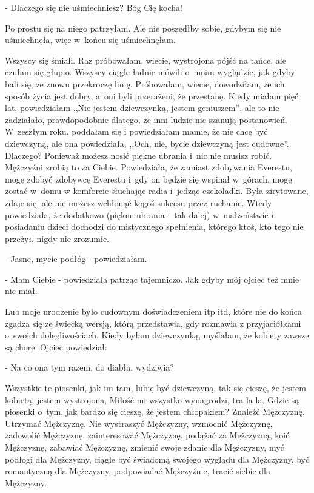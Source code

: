 \documentclass[oneside,polish,12pt,sfheadings]{mwbk}
\begin{document}
- Dlaczego się nie uśmiechniesz? Bóg Cię kocha!

 Po prostu się na niego patrzyłam. Ale
nie poszedłby sobie, gdybym się nie uśmiechnęła, więc w~końcu się
uśmiechnęłam.

Wszyscy się śmiali. Raz próbowałam, wiecie, wystrojona pójść na tańce,
ale czułam się głupio. Wszyscy ciągle ładnie mówili o~moim wyglądzie,
jak gdyby bali się, że znowu przekroczę linię. Próbowałam, wiecie,
dowodziłam, że ich sposób życia jest dobry, a~oni byli przerażeni,
że przestanę. Kiedy miałam pięć lat, powiedziałam ,,Nie jestem dziewczynką,
jestem geniuszem'', ale to nie zadziałało, prawdopodobnie dlatego,
że inni ludzie nie szanują postanowień. W~zeszłym roku, poddałam się
i powiedziałam mamie, że nie chcę być dziewczyną, ale ona powiedziała,
,,Och, nie, bycie dziewczyną jest cudowne''. Dlaczego? Ponieważ możesz
nosić piękne ubrania i~nic nie musisz robić. Mężczyźni zrobią to za
Ciebie. Powiedziała, że zamiast zdobywania Everestu, mogę zdobyć zdobywcę
Everestu i~gdy on będzie się wspinał w~górach, mogę zostać w~domu
w komforcie słuchając radia i~jedząc czekoladki. Była zirytowane,
zdaje się, ale nie możesz wchłonąć kogoś sukcesu przez ruchanie. Wtedy
powiedziała, że dodatkowo (piękne ubrania i~tak dalej) w~małżeństwie
i posiadaniu dzieci dochodzi do mistycznego spełnienia, którego ktoś,
kto tego nie przeżył, nigdy nie zrozumie. 

- Jasne, mycie podłóg -
powiedziałam.

- Mam Ciebie - powiedziała patrząc tajemniczo. Jak gdyby mój ojciec
też mnie nie miał.

Lub moje urodzenie było cudownym doświadczeniem itp itd, które nie
do końca zgadza się ze świecką wersją, którą przedstawia, gdy rozmawia
z przyjaciółkami o~swoich dolegliwościach. Kiedy byłam dziewczynką,
myślałam, że kobiety zawsze są chore. Ojciec powiedział: 

- Na co ona tym razem, do diabła, wydziwia? 

Wszystkie te piosenki, jak im tam,
lubię być dziewczyną, tak się cieszę, że jestem kobietą, jestem wystrojona,
Miłość mi wszystko wynagrodzi, tra la la. Gdzie są piosenki o~tym,
jak bardzo się cieszę, że jestem chłopakiem? Znaleźć Mężczyznę. Utrzymać
Mężczyznę. Nie wystraszyć Mężczyzny, wzmocnić Mężczyznę, zadowolić
Mężczyznę, zainteresować Mężczyznę, podążać za Mężczyzną, koić Mężczyznę,
zabawiać Mężczyznę, zmienić swoje zdanie dla Mężczyzny, myć podłogi
dla Mężczyzny, ciągle być świadomą swojego wyglądu dla Mężczyzny,
być romantyczną dla Mężczyzny, podpowiadać Mężczyźnie, tracić siebie
dla Mężczyzny. 
\end{document}
